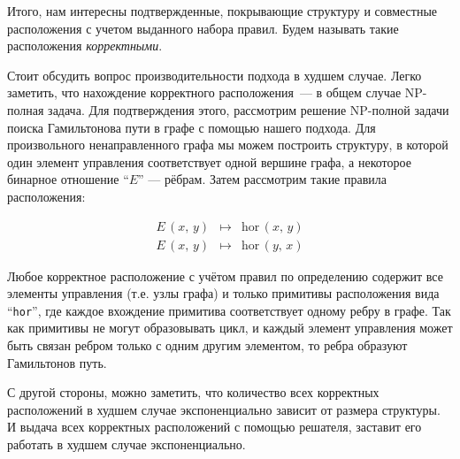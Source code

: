 
Итого, нам интересны подтвержденные, покрывающие структуру и совместные расположения с учетом выданного набора правил. Будем называть такие расположения \emph{корректными}.


Стоит обсудить вопрос производительности подхода в худшем случае. Легко заметить, что нахождение корректного расположения~--- в общем случае NP-полная задача.
Для подтверждения этого, рассмотрим решение NP-полной задачи поиска Гамильтонова пути в графе с помощью нашего подхода.
Для произвольного ненаправленного графа мы можем построить структуру, в которой один элемент управления соответствует одной вершине графа,  а некоторое бинарное отношение  ``$E$'' --- рёбрам. Затем рассмотрим такие правила расположения:


\[
\begin{array}{rcl}
  E\,(x,\, y) & \mapsto & \mbox{hor}\,(x,\, y)\\
  E\,(x,\, y) & \mapsto & \mbox{hor}\,(y,\, x)
\end{array}
\]

Любое корректное расположение с учётом правил по определению содержит все элементы управления (т.е. узлы графа) и только примитивы расположения вида ``\texttt{hor}'', где каждое вхождение примитива соответствует одному ребру в графе. Так как примитивы не могут образовывать цикл, и каждый элемент управления может быть связан ребром только с одним другим элементом, то ребра образуют Гамильтонов путь.

С другой стороны, можно заметить, что количество всех корректных расположений в худшем случае экспоненциально зависит от размера структуры.
И выдача всех корректных расположений с помощью решателя, заставит его работать в худшем случае экспоненциально.



